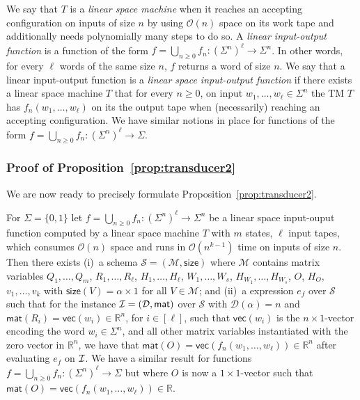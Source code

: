 We say that $T$ is a \textit{linear space machine} when it reaches an accepting configuration 
on inputs of size $n$ by using $\mathcal{O}(n)$ space on its work tape and additionally needs 
polynomially many steps to do so. A \textit{linear input-output function} is a function of the form 
$f=\bigcup_{n\geq 0} f_n:(\Sigma^n)^\ell\to\Sigma^n$. In other words, for every $\ell$ words of the same 
size $n$, $f$ returns a word of size $n$. We say that a linear input-output function is a 
\textit{linear space input-output function} if
there exists a linear space machine  $T$ that for every $n\geq 0$, on input $w_1,\ldots,w_\ell\in\Sigma^n$ 
the TM $T$ has
$f_n(w_1,\ldots,w_\ell)$ on its the output tape when (necessarily) reaching an accepting configuration.
We have similar notions in place for functions of the form $f=\bigcup_{n\geq 0} f_n:(\Sigma^n)^\ell\to\Sigma$.

\subsubsection{Proof of Proposition~\ref{prop:transducer2}}
We are now ready to precisely formulate  Proposition~\ref{prop:transducer2}.

\begin{proposition}
For $\Sigma = \{0,1\}$ let $f=\bigcup_{n\geq 0}f_n:(\Sigma^n)^\ell\to \Sigma^n$ be a linear space input-ouput function 
computed by a linear space  machine $T$ with $m$ states, $\ell$ input tapes, which consumes 
$\mathcal{O}(n)$ space and runs in $\mathcal{O}(n^{k-1})$ time on inputs of size $n$. 
Then there exists (i)~a \langfor 
schema $\mathcal{S}=(\mathcal{M},\textsf{size})$ where $\mathcal{M}$ contains matrix 
variables
$Q_1,\ldots,Q_m$, $R_1,\ldots,R_\ell$, $H_1,\ldots,H_\ell$, $W_1,\ldots,W_s$, $H_{W_1},\ldots,H_{W_s}$, $O$, $H_O$, $v_1,\ldots,v_{k}$  
with $\mathsf{size}(V)=\alpha\times 1$ for all $V\in\mathcal{M}$; and (ii)~a \langfor 
expression $e_f$ over $\mathcal{S}$ such that for the instance 
$\mathcal{I}=(\mathcal{D},\textsf{mat})$ over $\mathcal{S}$ with $\mathcal{D}(\alpha)=n$ and 
$\mathsf{mat}(R_i)=\mathsf{vec}(w_i)\in \mathbb{R}^n$, for $i\in[\ell]$, such that $\mathsf{vec}(w_i)$ is the $n\times 1$-vector 
encoding the word $w_i\in\Sigma^n$, and all other matrix variables instantiated with the zero vector in $\mathbb{R}^n$,  we have that  $\mathsf{mat}(O)=\mathsf{vec}(f_n(w_1,\ldots,w_\ell))\in\mathbb{R}^n$ 
after evaluating $e_f$ on $\mathcal{I}$. We have a similar result for functions $f=\bigcup_{n\geq 0}f_n:(\Sigma^n)^\ell\to \Sigma$
but where $O$ is now a $1\times 1$-vector such that $\mathsf{mat}(O)=\mathsf{vec}(f_n(w_1,\ldots,w_\ell))\in\mathbb{R}$. 
\end{proposition}

